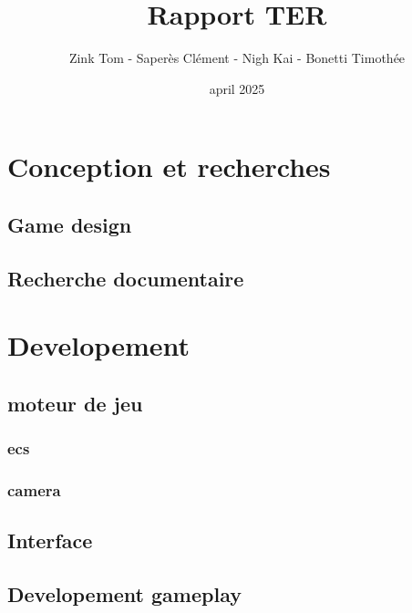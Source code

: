 \documentclass[french,a4paper,10pt]{article}
\title{\color{astral} \sffamily \bfseries Rapport TER}
\author{Zink Tom - Saperès Clément - Nigh Kai - Bonetti Timothée}
\date{april 2025}
\begin{document}
\maketitle

\hypersetup{
    hidelinks           %
}

\tableofcontents


\newpage


    

\newpage



\section{Conception et recherches}
    \subsection{Game design}
    
    
    \subsection{Recherche documentaire}


\section{Developement}
    
    
    \subsection{moteur de jeu}
        \subsubsection{ecs}
        \subsubsection{camera}

    \subsection{Interface}
    
    \subsection{Developement gameplay}
\end{document}
